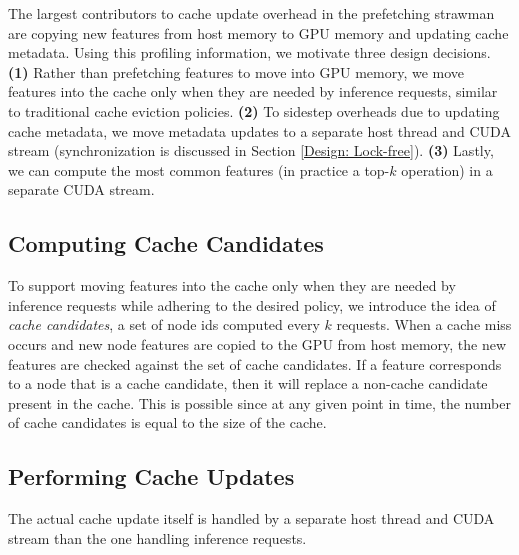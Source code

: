 The largest contributors to cache update overhead in the prefetching strawman are copying new features from host memory to GPU memory and updating cache metadata.
Using this profiling information, we motivate three design decisions.
\textbf{(1)} Rather than prefetching features to move into GPU memory, we move features into the cache only when they are needed by inference requests, similar to traditional cache eviction policies. 
\textbf{(2)} To sidestep overheads due to updating cache metadata, we move metadata updates to a separate host thread and CUDA stream (synchronization is discussed in Section \ref{Design: Lock-free}).
\textbf{(3)} Lastly, we can compute the most common features (in practice a top-$k$ operation) in a separate CUDA stream.


\subsection{Computing Cache Candidates}
To support moving features into the cache only when they are needed by inference requests while adhering to the desired policy, we introduce the idea of \textit{cache candidates}, a set of node ids computed every $k$ requests. When a cache miss occurs and new node features are copied to the GPU from host memory, the new features are checked against the set of cache candidates. If a feature corresponds to a node that is a cache candidate, then it will replace a non-cache candidate present in the cache. This is possible since at any given point in time, the number of cache candidates is equal to the size of the cache.



\subsection{Performing Cache Updates}
The actual cache update itself is handled by a separate host thread and CUDA stream than the one handling inference requests. 

